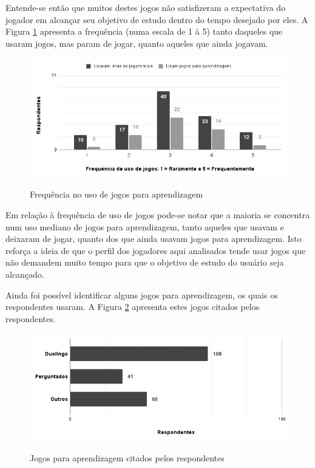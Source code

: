 
Entende-se então que muitos destes jogos não satisfizeram a expectativa do jogador em alcançar seu objetivo de estudo dentro do tempo desejado por eles. A Figura \ref{Fig:freq-jogo.png} apresenta a frequência (numa escala de 1 à 5) tanto daqueles que usaram jogos, mas param de jogar, quanto aqueles que ainda jogavam.

\begin{figure}[htbp]
	\centering
	\caption{Frequência no uso de jogos para aprendizagem}
	\includegraphics[keepaspectratio=true,scale=0.6]{figuras/resultados/freq-jogo.png}
	\label{Fig:freq-jogo.png}
\end{figure}

Em relação à frequência de uso de jogos pode-se notar que a maioria se concentra num uso mediano de jogos para aprendizagem, tanto aqueles que usavam e deixaram de jogar, quanto dos que ainda usavam jogos para aprendizagem. Isto reforça a ideia de que o perfil dos jogadores aqui analisados tende usar jogos que não demandem muito tempo para que o objetivo de estudo do usuário seja alcançado.

Ainda foi possível identificar alguns jogos para aprendizagem, os quais os respondentes usaram. A Figura \ref{Fig:jogo-cit.png} apresenta estes jogos citados pelos respondentes. %

\begin{figure}[htbp]
	\centering
	\caption{Jogos para aprendizagem citados pelos respondentes}
	\includegraphics[keepaspectratio=true,scale=0.6]{figuras/resultados/jogo-cit.png}
	\label{Fig:jogo-cit.png}
\end{figure}


